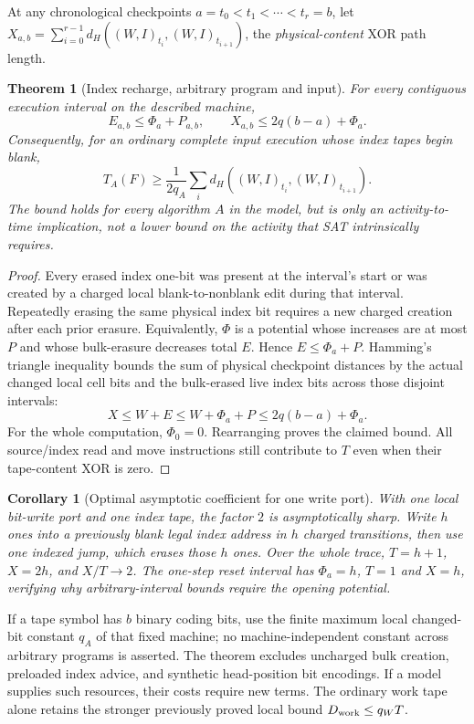 \documentclass[11pt]{article}
\newtheorem{theorem}{Theorem}
\newtheorem{corollary}{Corollary}
\begin{document}
At any chronological checkpoints $a=t_0<t_1<\cdots<t_r=b$, let
$X_{a,b}=\sum_{i=0}^{r-1}d_H((W,I)_{t_i},(W,I)_{t_{i+1}})$,
the \emph{physical-content} XOR path length.
\begin{theorem}[Index recharge, arbitrary program and input]
For every contiguous execution interval on the described machine,
\begin{equation}\label{eq:amort}
\boxed{E_{a,b}\le\Phi_a+P_{a,b},
\qquad
X_{a,b}\le2q(b-a)+\Phi_a.}
\end{equation}
Consequently, for an ordinary complete input execution whose index tapes begin blank,
\[
\boxed{T_A(F)\ge\frac{1}{2q_A}\sum_i
d_H((W,I)_{t_i},(W,I)_{t_{i+1}}).}
\]
The bound holds for every \emph{algorithm} $A$ in the model, but is only an activity-to-time implication, not a lower bound on the activity that SAT intrinsically requires.
\end{theorem}
\begin{proof}
Every erased index one-bit was present at the interval's start or was created by a charged local blank-to-nonblank edit during that interval. Repeatedly erasing the same physical index bit requires a new charged creation after each prior erasure. Equivalently, $\Phi$ is a potential whose increases are at most $P$ and whose bulk-erasure decreases total $E$. Hence $E\le\Phi_a+P$. Hamming's triangle inequality bounds the sum of physical checkpoint distances by the actual changed local cell bits and the bulk-erased live index bits across those disjoint intervals:
\[
X\le W+E\le W+\Phi_a+P\le2q(b-a)+\Phi_a.
\]
For the whole computation, $\Phi_0=0$. Rearranging proves the claimed bound. All source/index read and move instructions still contribute to $T$ even when their tape-content XOR is zero.
\end{proof}
\begin{corollary}[Optimal asymptotic coefficient for one write port]
With one local bit-write port and one index tape, the factor $2$ is asymptotically sharp. Write $h$ ones into a previously blank legal index address in $h$ charged transitions, then use one indexed jump, which erases those $h$ ones. Over the whole trace, $T=h+1$, $X=2h$, and $X/T\to2$. The one-step reset interval has $\Phi_a=h$, $T=1$ and $X=h$, verifying why arbitrary-interval bounds require the opening potential.
\end{corollary}

If a tape symbol has $b$ binary coding bits, use the finite maximum local changed-bit constant $q_A$ of that fixed machine; no machine-independent constant across arbitrary programs is asserted. The theorem excludes uncharged bulk creation, preloaded index advice, and synthetic head-position bit encodings. If a model supplies such resources, their costs require new terms. The ordinary work tape alone retains the stronger previously proved local bound $D_{\rm work}\le q_W T$.
\end{document}

